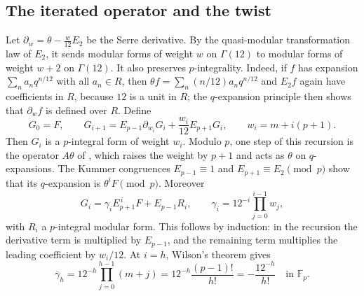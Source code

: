 \documentclass[11pt,a4paper]{article}
\numberwithin{equation}{section}
\theoremstyle{definition}
\theoremstyle{remark}
\newcommand{\Fp}{\mathbb F_p}
\begin{document}
\subsection{The iterated operator and the twist}
Let $\partial_w=\theta-\frac{w}{12}E_2$ be the Serre derivative.
By the quasi-modular transformation law of $E_2$, it sends modular forms
of weight $w$ on $\Gamma(12)$ to modular forms of weight $w+2$ on
$\Gamma(12)$. It also preserves $p$-integrality. Indeed, if $f$ has
expansion $\sum_na_nq^{n/12}$ with all $a_n\in R$, then
$\theta f=\sum_n(n/12)a_nq^{n/12}$ and $E_2f$ again have coefficients in
$R$, because $12$ is a unit in $R$; the $q$-expansion principle
\citep[\S1.6]{Katz73} then shows that $\partial_wf$ is defined over $R$.
Define
\[
G_0=F,\qquad
G_{i+1}=E_{p-1}\partial_{w_i}G_i+\frac{w_i}{12}E_{p+1}G_i,
\qquad w_i=m+i(p+1).
\]
Then $G_i$ is a $p$-integral form of weight $w_i$. Modulo $p$, one step of
this recursion is the operator $A\theta$ of \citet{Katz77}, which raises
the weight by $p+1$ and acts as $\theta$ on $q$-expansions. The Kummer congruences
$E_{p-1}\equiv1$ and $E_{p+1}\equiv E_2\pmod p$ show that its
$q$-expansion is $\theta^iF\pmod p$. Moreover
\begin{equation}\label{eq:factorial-leading}
G_i=\gamma_i E_{p+1}^{\,i}F+E_{p-1}R_i,\qquad
\gamma_i=12^{-i}\prod_{j=0}^{i-1}w_j,
\end{equation}
with $R_i$ a $p$-integral modular form. This follows by induction: in the
recursion the derivative term is multiplied by $E_{p-1}$, and the
remaining term multiplies the leading coefficient by $w_i/12$.
At $i=h$, Wilson's theorem gives
\begin{equation}\label{eq:factorial-gamma}
\overline\gamma_h
=12^{-h}\prod_{j=0}^{h-1}(m+j)
=12^{-h}\frac{(p-1)!}{h!}
=-\frac{12^{-h}}{h!}\quad\text{in }\Fp.
\end{equation}
\end{document}
